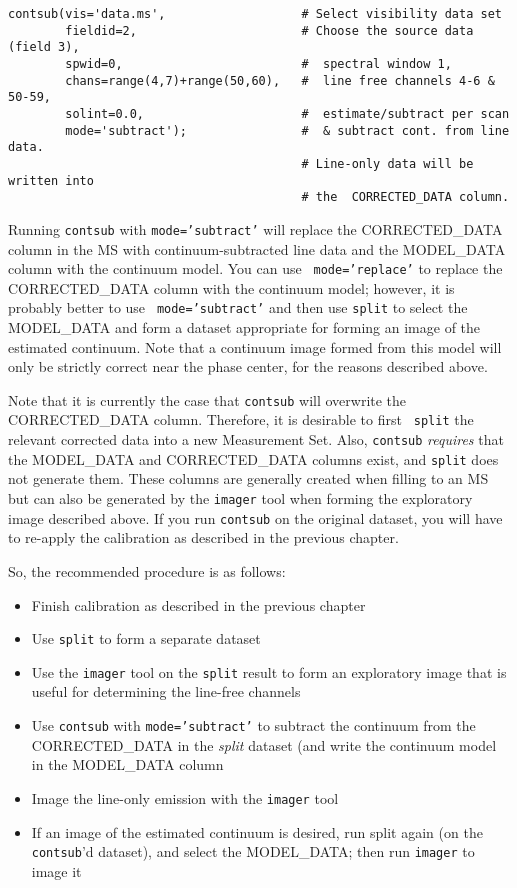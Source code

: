 \small
\begin{verbatim}
contsub(vis='data.ms',                   # Select visibility data set
        fieldid=2,                       # Choose the source data (field 3),
        spwid=0,                         #  spectral window 1,
        chans=range(4,7)+range(50,60),   #  line free channels 4-6 & 50-59,
        solint=0.0,                      #  estimate/subtract per scan
        mode='subtract');                #  & subtract cont. from line data.
                                         # Line-only data will be written into
                                         # the  CORRECTED_DATA column.
\end{verbatim}
\normalsize

Running {\tt contsub} with {\tt mode='subtract'} will replace the
CORRECTED\_DATA column in the MS with continuum-subtracted line data
and the MODEL\_DATA column with the continuum model.  You can use {\tt
mode='replace'} to replace the CORRECTED\_DATA column with the
continuum model; however, it is probably better to use {\tt
mode='subtract'} and then use {\tt split} to select the MODEL\_DATA
and form a dataset appropriate for forming an image of the estimated
continuum.  Note that a continuum image formed from this model will
only be strictly correct near the phase center, for the reasons
described above.

Note that it is currently the case that {\tt contsub} will overwrite
the CORRECTED\_DATA column. Therefore, it is desirable to first {\tt
split} the relevant corrected data into a new Measurement Set.  Also,
{\tt contsub} {\it requires} that the MODEL\_DATA and CORRECTED\_DATA
columns exist, and {\tt split} does not generate them.  These columns
are generally created when filling to an MS but can also be generated
by the {\tt imager} tool when forming the exploratory image described
above.  If you run {\tt contsub} on the original dataset, you will
have to re-apply the calibration as described in the previous chapter.

So, the recommended procedure is as follows: 

\begin{itemize}
   \item Finish calibration as described in the previous chapter
   \item Use {\tt split} to form a separate dataset
   \item Use the {\tt imager} tool on the {\tt split} result to form an
         exploratory image that is useful for determining the line-free
         channels
   \item Use {\tt contsub} with {\tt mode='subtract'} to subtract
         the continuum from the CORRECTED\_DATA in the {\it split} dataset (and
         write the continuum model in the MODEL\_DATA column
   \item Image the line-only emission with the {\tt imager} tool
   \item If an image of the estimated continuum is desired, run split
         again (on the {\tt contsub}'d dataset), and select the MODEL\_DATA; then
         run {\tt imager} to image it
\end{itemize}

